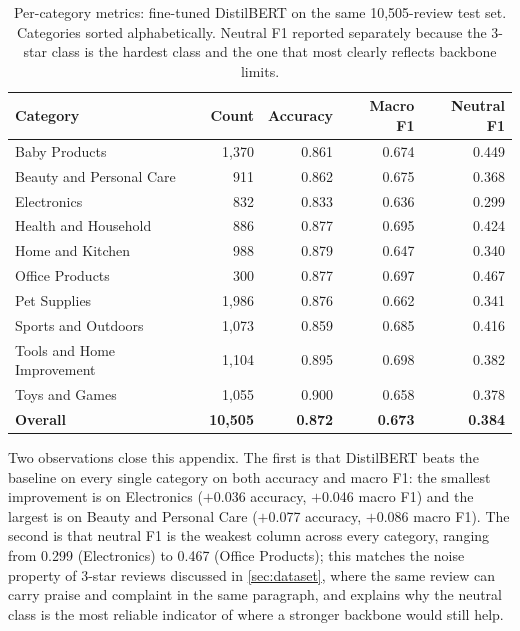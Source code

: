 \documentclass[12pt,a4paper]{report}
\begin{document}
\begin{table}[ht!]
  \centering
  \caption{Per-category metrics: fine-tuned DistilBERT on the same 10,505-review test set. Categories sorted alphabetically. Neutral F1 reported separately because the 3-star class is the hardest class and the one that most clearly reflects backbone limits.}
  \label{tab:percatdistil}
  \small
  \renewcommand{\arraystretch}{1.05}
  \begin{tabular}{@{}>{\raggedright\arraybackslash}p{2.4in}rrrr@{}}
    \toprule
    Category & Count & Accuracy & Macro F1 & Neutral F1 \\
    \midrule
    Baby Products & 1{,}370 & 0.861 & 0.674 & 0.449 \\
    Beauty and Personal Care & 911 & 0.862 & 0.675 & 0.368 \\
    Electronics & 832 & 0.833 & 0.636 & 0.299 \\
    Health and Household & 886 & 0.877 & 0.695 & 0.424 \\
    Home and Kitchen & 988 & 0.879 & 0.647 & 0.340 \\
    Office Products & 300 & 0.877 & 0.697 & 0.467 \\
    Pet Supplies & 1{,}986 & 0.876 & 0.662 & 0.341 \\
    Sports and Outdoors & 1{,}073 & 0.859 & 0.685 & 0.416 \\
    Tools and Home Improvement & 1{,}104 & 0.895 & 0.698 & 0.382 \\
    Toys and Games & 1{,}055 & 0.900 & 0.658 & 0.378 \\
    \midrule
    \textbf{Overall} & \textbf{10{,}505} & \textbf{0.872} & \textbf{0.673} & \textbf{0.384} \\
    \bottomrule
  \end{tabular}
\end{table}

Two observations close this appendix. The first is that DistilBERT beats the baseline on every single category on both accuracy and macro F1: the smallest improvement is on Electronics ($+$0.036 accuracy, $+$0.046 macro F1) and the largest is on Beauty and Personal Care ($+$0.077 accuracy, $+$0.086 macro F1). The second is that neutral F1 is the weakest column across every category, ranging from 0.299 (Electronics) to 0.467 (Office Products); this matches the noise property of 3-star reviews discussed in \cref{sec:dataset}, where the same review can carry praise and complaint in the same paragraph, and explains why the neutral class is the most reliable indicator of where a stronger backbone would still help.
\end{document}

